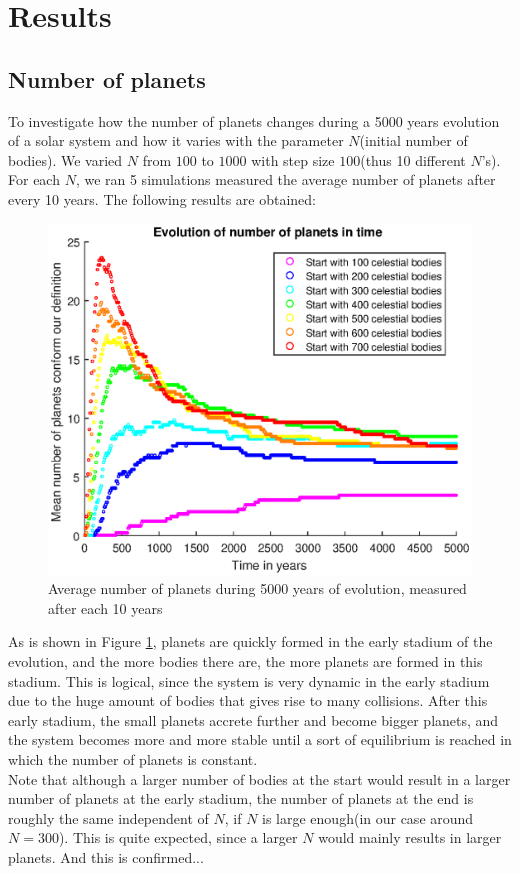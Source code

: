 \section{Results}
\subsection{Number of planets}
To investigate how the number of planets changes during a 5000 years evolution of a solar system and how it varies with the parameter $N$(initial number of bodies). We varied $N$ from $100$ to $1000$ with step size $100$(thus 10 different $N$'s). For each $N$, we ran 5 simulations measured the average number of planets after every 10 years. The following results are obtained:\\ 
\begin{figure}[H]
\centering
\includegraphics[scale=0.8]{AantPlaneten.eps}
\caption{Average number of planets during 5000 years of evolution, measured after each 10 years}
    \label{fig:AantPlaneten}
\end{figure}
As is shown in Figure \ref{fig:AantPlaneten}, planets are quickly formed in the early stadium of the evolution, and the more bodies there are, the more planets are formed in this stadium. This is logical, since the system is very dynamic in the early stadium due to the huge amount of bodies that gives rise to many collisions. After this early stadium, the small planets accrete further and become bigger planets, and the system becomes more and more stable until a sort of equilibrium is reached in which the number of planets is constant.\\

Note that although a larger number of bodies at the start would result in a larger number of planets at the early stadium, the number of planets at the end is roughly the same independent of $N$, if $N$ is large enough(in our case around $N=300$). This is quite expected, since a larger $N$ would mainly results in larger planets. And this is confirmed...